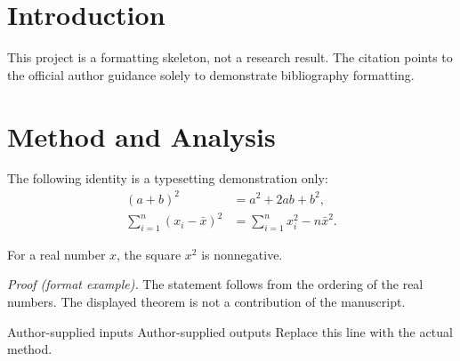 \section{Introduction}
\label{sec:introduction}
This project is a formatting skeleton, not a research result. The citation
\cite{formatguide} points to the official author guidance solely to demonstrate bibliography formatting.

\section{Method and Analysis}
\label{sec:method}
The following identity is a typesetting demonstration only:
\begin{equation}
\label{eq:identity}
\begin{aligned}
 (a+b)^2 &= a^2 + 2ab + b^2,\\
 \sum_{i=1}^{n}(x_i-\bar x)^2
 &= \sum_{i=1}^{n}x_i^2-n\bar x^2.
\end{aligned}
\end{equation}
\begin{PWTheorem}
For a real number $x$, the square $x^2$ is nonnegative.
\end{PWTheorem}
\textit{Proof (format example).} The statement follows from the ordering of the real numbers.
The displayed theorem is not a contribution of the manuscript.

\begin{algorithm}[htbp]
\caption{Pseudocode formatting example only}
\label{alg:format}
\let\AND\relax
\begin{algorithmic}[1]
\REQUIRE Author-supplied inputs
\ENSURE Author-supplied outputs
\STATE Replace this line with the actual method.
\end{algorithmic}
\end{algorithm}

